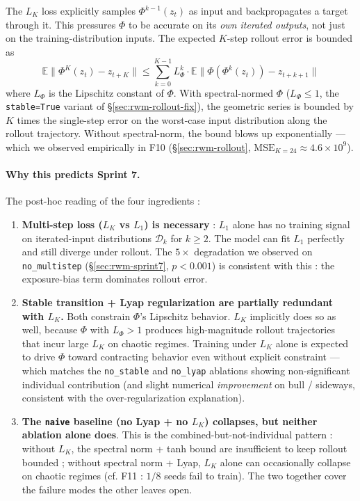 \documentclass[11pt,a4paper]{article}
\begin{document}
The $L_K$ loss explicitly samples $\Phi^{k-1}(z_t)$ as input and
backpropagates a target through it. This pressures $\Phi$ to be
accurate on its \emph{own iterated outputs}, not just on the
training-distribution inputs. The expected $K$-step rollout error
is bounded as
\[
\mathbb{E}\bigl\|\Phi^K(z_t) - z_{t+K}\bigr\|
  \leq \sum_{k=0}^{K-1} L^k_{\Phi}
  \cdot \mathbb{E}\bigl\|\Phi(\Phi^k(z_t)) - z_{t+k+1}\bigr\|
\]
where $L_{\Phi}$ is the Lipschitz constant of $\Phi$. With
spectral-normed $\Phi$ ($L_{\Phi} {\leq} 1$, the
\texttt{stable=True} variant of \S\ref{sec:rwm-rollout-fix}), the
geometric series is bounded by $K$ times the single-step error
on the worst-case input distribution along the rollout
trajectory. Without spectral-norm, the bound blows up
exponentially --- which we observed empirically in F10
(\S\ref{sec:rwm-rollout}, $\mathrm{MSE}_{K{=}24} \approx
4.6{\times}10^9$).

\paragraph{Why this predicts Sprint 7.} The post-hoc reading of
the four ingredients :
\begin{enumerate}[leftmargin=*]
\item \textbf{Multi-step loss ($L_K$ vs $L_1$) is necessary} :
  $L_1$ alone has no training signal on iterated-input
  distributions $\mathcal{D}_k$ for $k {\geq} 2$. The model can
  fit $L_1$ perfectly and still diverge under rollout. The
  $5{\times}$ degradation we observed on
  \texttt{no\_multistep} (\S\ref{sec:rwm-sprint7}, $p{<}0.001$)
  is consistent with this : the exposure-bias term dominates
  rollout error.
\item \textbf{Stable transition + Lyap regularization are
  partially redundant with $L_K$.} Both constrain $\Phi$'s
  Lipschitz behavior. $L_K$ implicitly does so as well, because
  $\Phi$ with $L_{\Phi} {>} 1$ produces high-magnitude rollout
  trajectories that incur large $L_K$ on chaotic regimes.
  Training under $L_K$ alone is expected to drive $\Phi$ toward
  contracting behavior even without explicit constraint --- which
  matches the \texttt{no\_stable} and \texttt{no\_lyap} ablations
  showing non-significant individual contribution (and slight
  numerical \emph{improvement} on bull / sideways, consistent
  with the over-regularization explanation).
\item \textbf{The \texttt{naive} baseline (no Lyap + no $L_K$)
  collapses, but neither ablation alone does}. This is the
  combined-but-not-individual pattern : without $L_K$, the
  spectral norm + tanh bound are insufficient to keep rollout
  bounded ; without spectral norm + Lyap, $L_K$ alone can
  occasionally collapse on chaotic regimes (cf. F11 :
  $1/8$ seeds fail to train). The two together cover the failure
  modes the other leaves open.
\end{enumerate}
\end{document}
